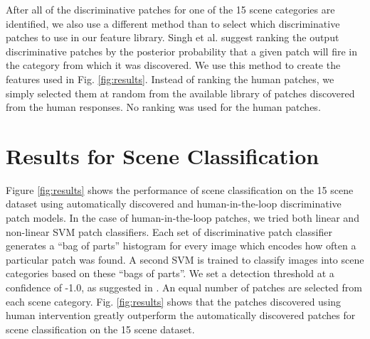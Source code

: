 \documentclass[10pt,twocolumn,letterpaper]{article}
\begin{document}


After all of the discriminative patches for one of the 15 scene categories are identified, we also use a different method than \cite{singh2012unsupervised} to select which discriminative patches to use in our feature library. Singh et al. suggest ranking the output discriminative patches by the posterior probability that a given patch will fire in the category from which it was discovered. We use this method to create the features used in Fig. \ref{fig:results}. Instead of ranking the human patches, we simply selected them at random from the available library of patches discovered from the human responses. No ranking was used for the human patches.

\section{Results for Scene Classification}
Figure \ref{fig:results} shows the performance of scene classification on the 15 scene dataset using automatically discovered and human-in-the-loop discriminative patch models. In the case of human-in-the-loop patches, we tried both linear and non-linear SVM patch classifiers. Each set of discriminative patch classifier generates a ``bag of parts'' histogram for every image which encodes how often a particular patch was found. A second SVM is trained to classify images into scene categories based on these ``bags of parts''.  We set a detection threshold at a confidence of -1.0, as suggested in \cite{singh2012unsupervised}. An equal number of patches are selected from each scene category. Fig. \ref{fig:results} shows that the patches discovered using human intervention greatly outperform the automatically discovered patches for scene classification on the 15 scene dataset.
\end{document}
